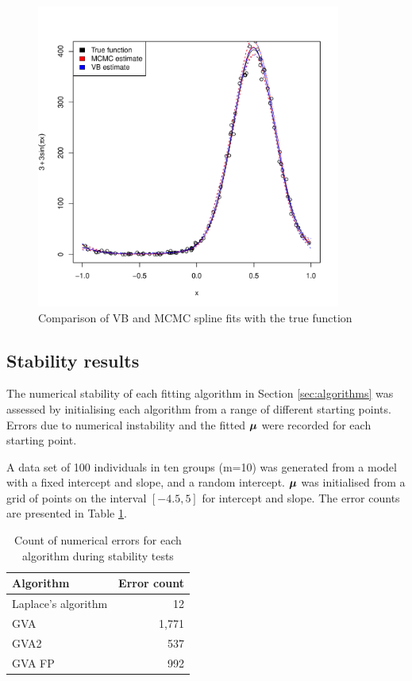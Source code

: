 \documentclass{article}[12pt]
\begin{document}
\begin{figure}
\label{fig:spline}
\caption{Comparison of VB and MCMC spline fits with the true function}
\includegraphics[width=100mm, height=100mm]{code/results/accuracy_plots_spline_gva2.pdf}
\end{figure}


\subsection{Stability results}

The numerical stability of each fitting algorithm in Section \ref{sec:algorithms} was assessed by initialising
each algorithm from a range of different starting points. Errors due to numerical instability and the fitted
${\boldsymbol \mu}$ were recorded for each starting point.

A data set of 100 individuals in ten groups (m=10) was generated from a model with a fixed intercept
and slope, and a random intercept. ${\boldsymbol \mu}$ was initialised from a grid of points on the interval
$[-4.5, 5]$ for intercept and slope. The error counts are presented in Table
\ref{tab:stability_results}.

\begin{table}
\caption{Count of numerical errors for each algorithm during stability tests}
\label{tab:stability_results}
\begin{tabular}{|l|r|}
\hline
Algorithm & Error count \\
\hline
Laplace's algorithm & 12 \\
GVA & 1,771 \\
GVA2 & 537 \\
GVA FP & 992 \\
\hline
\end{tabular}
\end{table}
\end{document}
